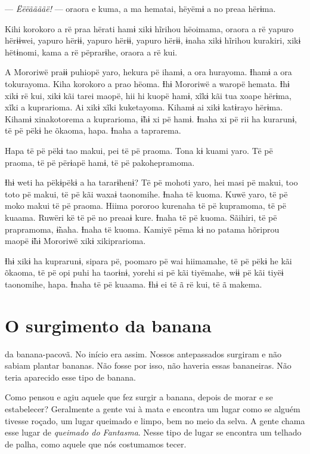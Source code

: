 --- \textit{Ëëëããããë!} --- oraora e kuma, a ma hematai, hëyëmɨ a no preaa hërɨma. 

Kihi korokoro a rë praa hërati hamɨ xikɨ hĩrihou hëoimama, oraora a rë
yapuro hërɨɨwei, yapuro hërɨɨ, yapuro hërɨɨ, yapuro hërɨɨ, ɨnaha xikɨ
hĩrihou kurakiri, xikɨ hëtɨnomi, kama a rë pëprarɨhe, oraora a rë kui. 

A Mororiwë praɨɨ puhiopë yaro, hekura pë ihamɨ, a ora hurayoma. Ɨhamɨ a
ora tokurayoma. Kiha korokoro a prao hëoma. Ɨhɨ Mororiwë a waropë
hemata. Ɨhɨ xikɨ rë kui, xikɨ kãi tarei maopë, hii hi kuopë hamɨ, xĩkɨ
kãi tua xoape hërɨma, xĩki a kuprarioma. Ai xikɨ xĩki kuketayoma. Kihamɨ
ai xikɨ katɨrayo hërɨma. Kihamɨ xinakotorema a kuprarioma, ɨ̃hɨ xi pë
hamɨ. Ɨnaha xi pë rii ha kurarunɨ, të pë pëkɨ he õkaoma, hapa. Ɨnaha a
taprarema. 

Hapa të pë pëkɨ tao makui, pei të pë praoma. Tona kɨ kuami yaro. Të pë
praoma, të pë përɨapë hamɨ, të pë pakohepramoma. 

Ɨhɨ weti ha pëkɨpëkɨ a ha tararɨhenɨ? Të pë mohoti yaro, hei masi pë
makui, too toto pë makui, të pë kãi waxaɨ taonomihe. Ɨnaha të kuoma.
Kuwë yaro, të pë moko makui të pë praoma. Hiima pororoo kurenaha të pë
kupramoma, të pë kuaama. Ruwëri kë të pë no preaaɨ kure. Ɨnaha të pë
kuoma. Sãihiri, të pë prapramoma, ɨ̃naha. Ɨnaha të kuoma. Kamiyë pëma kɨ
no patama hõriprou maopë ɨ̃hɨ Mororiwë xikɨ xikiprarioma. 

Ɨhɨ xikɨ ha kuprarunɨ, sipara pë, poomaro pë wai hiimamahe, të pë pëkɨ
he kãi õkaoma, të pë opi puhi ha taorɨnɨ, yorehi si pë kãi tiyëmahe, wɨɨ
pë kãi tiyëɨ taonomihe, hapa. Ɨnaha të pë kuaama. Ɨhɨ ei të ã rë kui, të
ã makema.

\chapter{O surgimento da banana}
 
 da banana-pacovã. No início era assim. Nossos antepassados
surgiram e não sabiam plantar bananas. Não fosse por isso, não haveria
essas bananeiras. Não teria aparecido esse tipo de banana. 

Como pensou e agiu aquele que fez surgir a banana, depois de morar e se
estabelecer? Geralmente a gente vai à mata e encontra um lugar como se
alguém tivesse roçado, um lugar queimado e limpo, bem no meio da selva.
A gente chama esse lugar de \textit{queimado do Fantasma}. Nesse tipo de
lugar se encontra um telhado de palha, como aquele que nós costumamos
tecer. 

